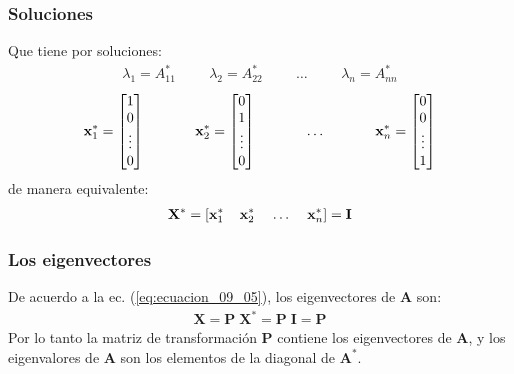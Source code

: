 \documentclass[12pt]{beamer}
\begin{document}
\begin{frame}
\frametitle{Soluciones}
Que tiene por soluciones:
\pause
\begin{align}
\lambda_{1} = A_{11}^{*} \hspace{1cm} \lambda_{2} = A_{22}^{*} \hspace{1cm} \ldots \hspace{1cm} \lambda_{n} = A_{nn}^{*}
\label{eq:ecuacion_09_07}
\end{align}
\renewcommand{\arraystretch}{0.85}
\begin{align}
\mathbf{x}_{1}^{*} =
\begin{bmatrix}
1 \\
0 \\
\vdots \\
0
\end{bmatrix} \hspace{1.25cm}
\mathbf{x}_{2}^{*} =
\begin{bmatrix}
0 \\
1 \\
\vdots \\
0
\end{bmatrix} \hspace{1.25cm} \ldots \hspace{1.25cm}
\mathbf{x}_{n}^{*} =
\begin{bmatrix}
0 \\
0 \\
\vdots \\
1
\end{bmatrix}
\end{align}
\pause
de manera equivalente:
\pause
\begin{align*}
\mathbf{X^{*}} = \left[ \mathbf{x}_{1}^{*} \hspace{0.4cm} \mathbf{x}_{2}^{*} \hspace{0.4cm} \ldots \hspace{0.4cm} \mathbf{x}_{n}^{*} \right] = \mathbf{I}
\end{align*}
\end{frame}
\begin{frame}
\frametitle{Los eigenvectores}
De acuerdo a la ec. (\ref{eq:ecuacion_09_05}), los eigenvectores de $\mathbf{A}$ son:
\pause
\begin{align}
\mathbf{X} = \mathbf{P \; X}^{*} = \mathbf{P \; I} = \mathbf{P}
\label{eq:ecuacion_09_08}
\end{align}
\pause
Por lo tanto la matriz de transformación $\mathbf{P}$ contiene los eigenvectores de $\mathbf{A}$, y los eigenvalores de $\mathbf{A}$ son los elementos de la diagonal de $\mathbf{A}^{*}$.
\end{frame}
\end{document}

